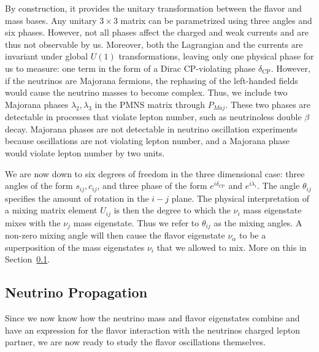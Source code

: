 By construction, it provides the unitary transformation between the flavor and mass bases.
Any unitary $3\times3$ matrix can be parametrized using three angles and six phases. However, not all phases affect the 
charged and weak currents and are thus not observable by us. Moreover, both the Lagrangian and the currents are invariant under global $U(1)$ transformations,
leaving only one physical phase for us to measure: one term in the form of a Dirac CP-violating phase $\delta_\mathrm{CP}$.
However, if the neutrinos are Majorana fermions, the rephasing of the left-handed fields would cause the neutrino masses to become complex.
Thus, we include two Majorana phases $\lambda_{2},\lambda_3$ in the PMNS matrix through $P_{Maj}$. These two phases are detectable in processes that violate lepton number, such as neutrinoless double $\beta$ decay.
Majorana phases are not detectable in neutrino oscillation experiments because oscillations are not violating lepton number, and a Majorana phase would
violate lepton number by two units.

We are now down to six degrees of freedom in the three dimensional case: three angles
of the form $s_{ij}, c_{ij}$, and three phase of the form $e^{i\delta_\mathrm{CP}}$ and $e^{i\lambda_{i}}$. The angle $\theta_{ij}$ specifies the amount of rotation in the $i-j$ plane. The physical interpretation of
a mixing matrix element $U_{ij}$ is then the degree to which the $\nu_i$ mass eigenstate mixes with the $\nu_j$ mass eigenstate. Thus we refer to $\theta_{ij}$ as the mixing angles. A non-zero mixing angle will then 
cause the flavor eigenstate $\nu_\alpha$ to be a superposition of the mass eigenstates $\nu_i$ that we allowed to mix. More on this in Section~\ref{sec:prop}.


\subsection{Neutrino Propagation}\label{sec:prop}
Since we now know how the neutrino mass and flavor eigenstates combine and have an expression for the flavor interaction with 
the neutrinos charged lepton partner, we are now ready to study the flavor oscillations themselves.

